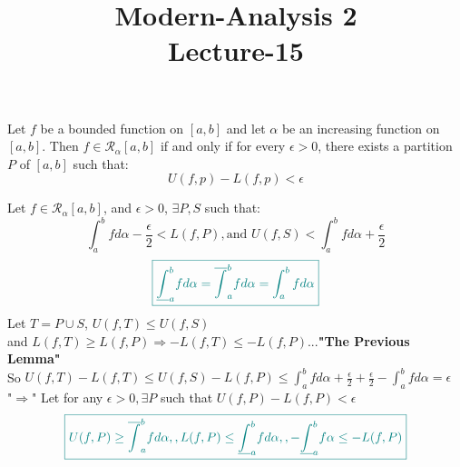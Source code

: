 \documentclass[12pt]{amsbook}
\title{\Huge{Modern-Analysis 2\\Lecture-15}}
\begin{document}
\begin{tcolorbox}[colback=brown!10!white,colframe=brown!50!black]
\maketitle

\begin{tcolorbox}[enhanced,attach boxed title to top center={yshift=-3mm,yshifttext=-1mm},
  colback=teal!10!white,colframe=teal!60!black,colbacktitle=teal!70!black,
  title={\textbf{Theorem (Riemann's Condtion)}}:,fonttitle=\bfseries,
  boxed title style={size=small,colframe=teal!50!black} ]
Let $f$ be a bounded function on $[a,b]$ and let $\alpha$ be an increasing function on $[a,b]$. Then 
$f\in\mathscr{R}_\alpha[a,b]$ if and only if for every $\epsilon>0$, there exists a partition $P$ of $[a,b]$ such that:
$$U(f,p)-L(f,p)<\epsilon$$
\end{tcolorbox}


{} Let $f\in\mathscr{R}_\alpha[a,b]$, and $\epsilon>0$, $\exists P,S$ such that:
$$\int_a^b fd\alpha-\frac{\epsilon}{2}<L(f,P),\text{and } U(f,S)<\int_a^b fd\alpha+\frac{\epsilon}{2}$$
$$\color{teal}\boxed{\underline{\int}_a^b fd\alpha=\overline{\int}_a^b f d\alpha=\int_a^b f d\alpha}$$
Let $T=P\cup S$,
$U(f,T)\leq U(f,S)$\\
and $L(f,T)\geq L(f,P)\Rightarrow-L(f,T)\leq -L(f,P)$...{\color{teal}\textbf{"The Previous Lemma"}}\\
So $U(f,T)-L(f,T)\leq U(f,S)-L(f,P)\leq\int_a^b fd\alpha+\frac{\epsilon}{2}+\frac{\epsilon}{2}-\int_a^b fd\alpha=\epsilon$\\
{\color{teal}"$\Longrightarrow$"} Let for any $\epsilon>0,\exists P$ such that $U(f,P)-L(f,P)<\epsilon$
$${\color{teal}\boxed{U(f,P)\geq\overline{\int}_a^b f d\alpha,, L(f,P)\leq\underline{\int}_a^b f d\alpha,,-\underline{\int }_a^b 
f\alpha\leq-L(f,P)}}$$
\end{tcolorbox}

\end{document}
